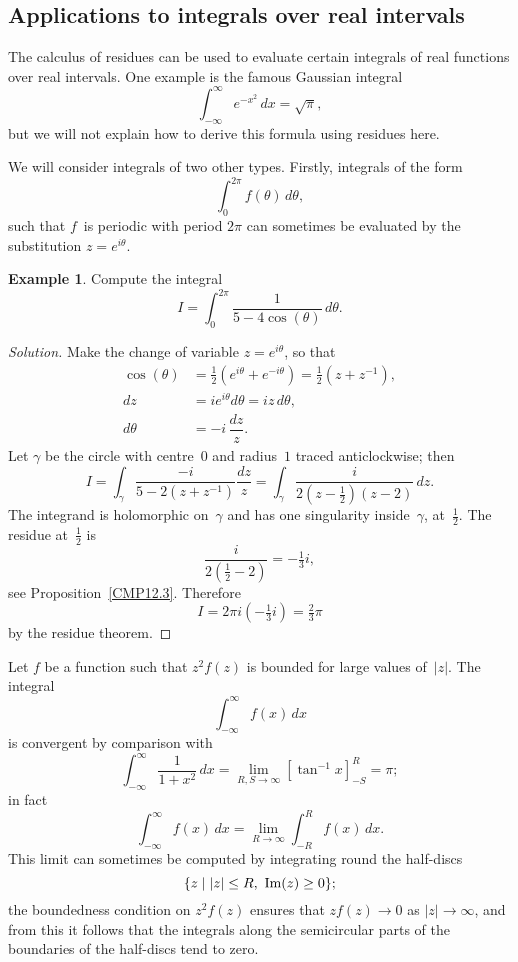\documentclass{amsproc}
\theoremstyle{definition}
\newtheorem{example}[theorem]{Example}
\newenvironment{solution}{\begin{proof}[Solution]}{\end{proof}}
\theoremstyle{remark}
\renewcommand{\Im}{\mathop{\textup{Im}}}
\numberwithin{equation}{section}
\begin{document}
\vfill\pagebreak


\subsection{Applications to integrals over real intervals} \label{CMS13}

The calculus of residues can be used to evaluate certain integrals of real functions over real intervals. One example is the famous Gaussian integral
$$
\int_{-\infty}^\infty e^{-x^2}\,dx=\sqrt{\pi},
$$
but we will not explain how to derive this formula using residues here.

We will consider integrals of two other types. Firstly, integrals of the form
$$
\int_0^{2\pi} f(\theta)\,d\theta,
$$
such that $ f $~is periodic with period $ 2\pi $ can sometimes be evaluated by the substitution $ z = e^{i\theta} $.

\begin{example} \label{CME13.1}
Compute the integral
$$
I = \int_0^{2\pi} \dfrac{1}{5 - 4\cos(\theta)}\,d\theta.
$$
\end{example}

\begin{solution}
Make the change of variable $ z = e^{i\theta} $, so that
\begin{align*}
\cos(\theta) &= \tfrac{1}{2}(e^{i\theta} + e^{-i\theta}) = \tfrac{1}{2}(z+z^{-1}), \\
dz &= ie^{i\theta} d\theta = iz\,d\theta, \\
d\theta &= -i\,\dfrac{dz}{z}.
\end{align*}
Let $ \gamma $ be the circle with centre~$ 0 $ and radius~$ 1 $ traced anticlockwise; then
$$
I = \int_\gamma\dfrac{-i}{5 - 2(z + z^{-1})} \dfrac{dz}{z} = \int_\gamma \dfrac{i}{2(z - \tfrac{1}{2})(z - 2)}\,dz.
$$
The integrand is holomorphic on~$ \gamma $ and has one singularity inside~$ \gamma $, at~$ \tfrac{1}{2} $. The residue at~$ \tfrac{1}{2} $ is
$$
\dfrac{i}{2(\tfrac{1}{2} - 2)} = -\tfrac{1}{3}i,
$$
see Proposition~\ref{CMP12.3}. Therefore
$$
I = 2\pi i(-\tfrac{1}{3}i) = \tfrac{2}{3}\pi
$$
by the residue theorem.
\end{solution}

Let $ f $ be a function such that $ z^2 f(z) $ is bounded for large values of~$ |z| $. The integral
$$
\int_{-\infty}^\infty f(x)\,dx
$$
is convergent by comparison with
$$
\int_{-\infty}^\infty \dfrac{1}{1 + x^2}\,dx = \lim_{R,S \to \infty}[\tan^{-1}x]_{-S}^R = \pi;
$$
in fact
$$
\int_{-\infty}^\infty f(x)\,dx = \lim_{R \to \infty} \int_{-R}^R f(x)\,dx.
$$
This limit can sometimes be computed by integrating round the half-discs
$$
\{z \mid |z| \leq R,\ \Im(z) \geq 0 \};
$$
the boundedness condition on $ z^2 f(z) $ ensures that $ z f(z) \to 0 $ as $ |z| \to \infty $, and from this it follows that the integrals along the semicircular parts of the
boundaries of the half-discs tend to zero.
\end{document}
